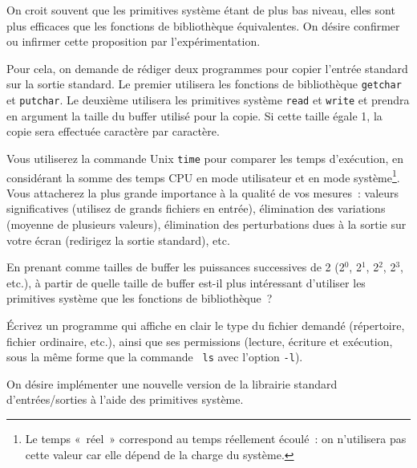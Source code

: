 \question

On croit souvent que les primitives système étant de plus bas niveau,
elles sont plus efficaces que les fonctions de bibliothèque
équivalentes. On désire confirmer ou infirmer cette proposition par
l'expérimentation.

Pour cela, on demande de rédiger deux programmes pour copier l'entrée
standard sur la sortie standard. Le premier utilisera les fonctions
de bibliothèque \texttt {getchar} et \texttt {putchar}.  Le deuxième
utilisera les primitives système \texttt {read} et \texttt {write}
et prendra en argument la taille du buffer utilisé pour la copie.
Si cette taille égale 1, la copie sera effectuée caractère par
caractère.

Vous utiliserez la commande Unix \texttt {time} pour comparer les temps
d'exécution, en considérant la somme des temps CPU en mode utilisateur
et en mode système\footnote {Le temps «~réel~» correspond au temps
réellement écoulé~: on n'utilisera pas cette valeur car elle dépend
de la charge du système.}.  Vous attacherez la plus grande importance à
la qualité de vos mesures~: valeurs significatives (utilisez de grands
fichiers en entrée), élimination des variations (moyenne de plusieurs
valeurs), élimination des perturbations dues à la sortie sur votre
écran (redirigez la sortie standard), etc.

En prenant comme tailles de buffer les puissances successives de 2
(2$^0$, 2$^1$, 2$^2$, 2$^3$, etc.), à partir de quelle taille de
buffer est-il plus intéressant d'utiliser les primitives système
que les fonctions de bibliothèque~?


\question

Écrivez un programme qui affiche en clair le type du fichier demandé
(répertoire, fichier ordinaire, etc.), ainsi que ses permissions
(lecture, écriture et exécution, sous la même forme que la commande {\tt
ls} avec l'option {\tt -l}).


\question

On désire implémenter une nouvelle version de la librairie standard
d'entrées/sorties à l'aide des primitives système.

